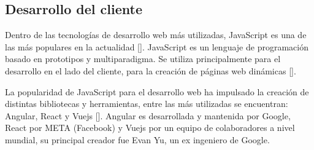 \subsection{Desarrollo del cliente}
Dentro de las tecnologías de desarrollo web más utilizadas, 
JavaScript es una de las más populares en la actualidad [\cite{java_script_stadistics}]. JavaScript es 
un lenguaje de programación basado en prototipos y multiparadigma.
Se utiliza principalmente para el desarrollo en el lado del cliente, para la
creación de páginas web dinámicas [\cite{java_script}]. 


La popularidad de JavaScript para el desarrollo web ha impulsado
la creación de distintas bibliotecas y herramientas, entre las más 
utilizadas se encuentran: Angular, React y Vuejs [\cite{front_end_frameworks}]. Angular es desarrollada 
y mantenida por Google, React por META (Facebook) y Vuejs por un 
equipo de colaboradores a nivel mundial, su principal creador fue Evan Yu, un ex ingeniero
de Google. 




